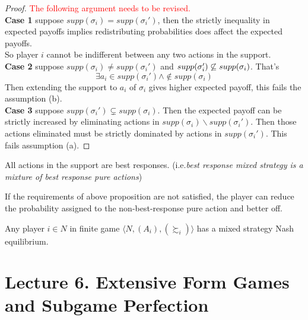\documentclass[11pt]{article}
\begin{document}
\begin{proof}
			\textcolor{red}{The following argument needs to be revised.}\\
			\textbf{Case 1} suppose $supp(\sigma_i) = supp(\sigma_i')$, then the strictly inequality in expected payoffs implies redistributing probabilities does affect the expected payoffs.\\
			So player $i$ cannot be indifferent between any two actions in the support. \\
			\textbf{Case 2} suppose $supp(\sigma_i) \neq supp(\sigma_i')$ and $supp(\sigma_i') \centernot \subseteq supp(\sigma_i)$. That's
			\[
				\exists a_i \in supp(\sigma_i') \land \notin supp(\sigma_i)
			\]
			Then extending the support to $a_i$ of $\sigma_i$ gives higher expected payoff, this fails the assumption (b). \\
			\textbf{Case 3} suppose $supp(\sigma_i') \subsetneq supp(\sigma_i)$. Then the expected payoff can be strictly increased by eliminating actions in $supp(\sigma_i) \backslash supp(\sigma_i')$. Then those actions eliminated must be strictly dominated by actions in $supp(\sigma_i')$. This fails assumption (a).
		\end{proof}
		
		
		\begin{proposition}
			All actions in the support are best responses. (i.e.\emph{best response mixed strategy is a mixture of best response pure actions})
		\end{proposition}
		
		\begin{remark}
			If the requirements of above proposition are not satisfied, the player can reduce the probability assigned to the non-best-response pure action and better off.
		\end{remark}
		
		\begin{theorem}
			Any player $i \in N$ in finite game $\langle N, (A_i), (\succsim_i) \rangle$ has a mixed strategy Nash equilibrium.
		\end{theorem}
		
	\section{Lecture 6. Extensive Form Games and Subgame Perfection}
\end{document}

